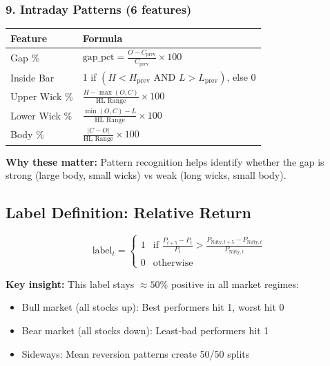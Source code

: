 \documentclass[11pt,a4paper]{article}
\begin{document}
\subsubsection{9. Intraday Patterns (6 features)}

\begin{table}[h]
\centering
\begin{tabular}{ll}
\toprule
\textbf{Feature} & \textbf{Formula} \\
\midrule
Gap \% & $\text{gap\_pct} = \frac{O - C_{\text{prev}}}{C_{\text{prev}}} \times 100$ \\
Inside Bar & 1 if $(H < H_{\text{prev}} \text{ AND } L > L_{\text{prev}})$, else 0 \\
Upper Wick \% & $\frac{H - \max(O, C)}{\text{HL Range}} \times 100$ \\
Lower Wick \% & $\frac{\min(O, C) - L}{\text{HL Range}} \times 100$ \\
Body \% & $\frac{|C - O|}{\text{HL Range}} \times 100$ \\
\bottomrule
\end{tabular}
\end{table}

\textbf{Why these matter:} Pattern recognition helps identify whether the gap is strong (large body, small wicks) vs weak (long wicks, small body).

\subsection{Label Definition: Relative Return}

\begin{equation}
\text{label}_t = \begin{cases}
1 & \text{if } \frac{P_{t+5} - P_t}{P_t} > \frac{P_{\text{Nifty},t+5} - P_{\text{Nifty},t}}{P_{\text{Nifty},t}} \\
0 & \text{otherwise}
\end{cases}
\end{equation}

\textbf{Key insight:} This label stays $\approx 50\%$ positive in all market regimes:
\begin{itemize}
    \item Bull market (all stocks up): Best performers hit 1, worst hit 0
    \item Bear market (all stocks down): Least-bad performers hit 1
    \item Sideways: Mean reversion patterns create 50/50 splits
\end{itemize}
\end{document}

